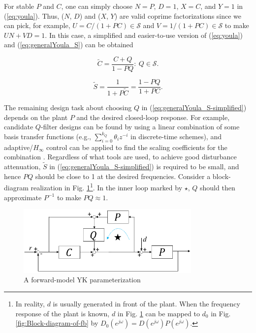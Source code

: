 \documentclass [11pt, proquest] {uwthesis}[2020/02/24]
\begin{document}
For stable $P$ and $C$, one can simply choose $N=P$, $D=1$, $X=C$,
and $Y=1$ in (\ref{eq:youla}). Thus, ($N$, $D$) and ($X$, $Y$)
are valid coprime factorizations since we can pick, for example, $U=C/(1+PC)\in\mathcal{S}$
and $V=1/(1+PC)\in\mathcal{S}$ to make $UN+VD=1$. In this case,
a simplified and easier-to-use version of (\ref{eq:youla}) and (\ref{eq:generalYoula_S})
can be obtained

\begin{equation}
\tilde{C}=\frac{C+Q}{1-PQ}:\ Q\in\mathcal{S}.\label{eq:youla-simplified}
\end{equation}

\begin{equation}
\tilde{S}=\frac{1}{1+P\tilde{C}}=\frac{1-PQ}{1+PC}.\label{eq:generalYoula_S-simplified}
\end{equation}

The remaining design task about choosing $Q$ in (\ref{eq:generalYoula_S-simplified})
depends on the plant $P$ and the desired closed-loop response. For
example, candidate $Q$-filter designs can be found by using a linear
combination of some basis transfer functions (e.g., $\sum_{i=0}^{k_{Q}}\theta_{i}z^{-i}$
in discrete-time schemes), and adaptive/$H_{\infty}$ control can
be applied to find the scaling coefficients for the combination \cite{chen2013selective}.
Regardless of what tools are used, to achieve good disturbance attenuation,
$\tilde{S}$ in (\ref{eq:generalYoula_S-simplified}) is required
to be small, and hence $PQ$ should be close to 1 at the desired frequencies.
Consider a block-diagram realization in Fig. \ref{fig:A-forward-model-Youla}\footnote{In reality, $d$ is usually generated in front of the plant. When
the frequency response of the plant is known, $d$ in Fig. \ref{fig:A-forward-model-Youla}
can be mapped to $d_{0}$ in Fig. \ref{fig:Block-diagram-of-fb}
by $D_{0}(e^{j\omega})=D(e^{j\omega})P(e^{j\omega})$.}. In the inner loop marked by $\star$, $Q$ should then approximate
$P^{-1}$ to make $PQ\approx1$.
\begin{figure}[!ht]
\begin{centering}
\includegraphics[width=9cm]{Loop-shaping/block diagram-2}
\par\end{centering}
\caption{\label{fig:A-forward-model-Youla}A forward-model YK parameterization}
\end{figure}
\end{document}
